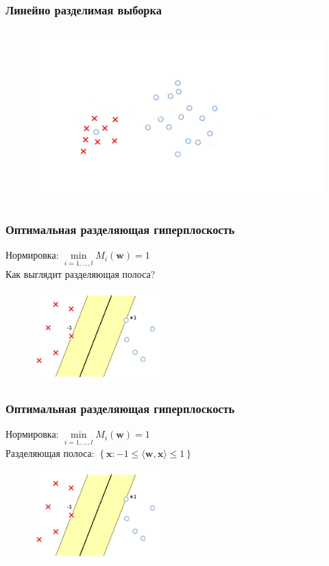 \documentclass[12pt]{beamer}
\begin{document}
\begin{frame}\frametitle{Линейно разделимая выборка}
\begin{figure}[htbp]
  \includegraphics[height=190pt, keepaspectratio = true]{images/linearly_unseparable}   
\end{figure}
\end{frame}

\begin{frame}\frametitle{Оптимальная разделяющая гиперплоскость}
Нормировка: $\min\limits_{i = 1, \dots , l} M_i(\mathbf{w}) = 1$\\
Как выглядит разделяющая полоса?
\begin{figure}[htbp]
  \includegraphics[height=100pt, keepaspectratio = true]{images/linearly_separable3}   
\end{figure}
\end{frame}


\begin{frame}\frametitle{Оптимальная разделяющая гиперплоскость}
Нормировка: $\min\limits_{i = 1, \dots , l} M_i(\mathbf{w}) = 1$\\
Разделяющая полоса: $\left\{\mathbf{x}: -1 \leq \langle \mathbf{w}, \mathbf{x}\rangle \leq 1\right\}$
\begin{figure}[htbp]
  \includegraphics[height=100pt, keepaspectratio = true]{images/linearly_separable3}   
\end{figure}
\end{frame}
\end{document}
